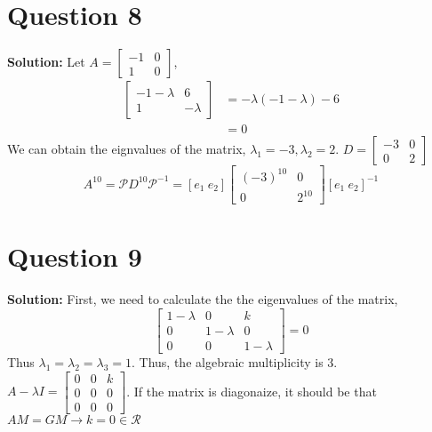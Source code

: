 \documentclass[11pt]{article} %
\begin{document}
\section{Question 8}
\textbf{Solution:}
Let $A=\begin{bmatrix}
	-1&0\\
	1&0
\end{bmatrix}$, 
\begin{align*}
	\begin{bmatrix}
		-1-\lambda&6\\
		1&-\lambda
	\end{bmatrix}&=-\lambda(-1-\lambda)-6\\
	&=0
\end{align*}
We can obtain the eignvalues of the matrix, $\lambda_1=-3, \lambda_2=2$. $D=\begin{bmatrix}
	-3&0\\
	0&2
\end{bmatrix}$
$$A^{10}=\mathcal{P}D^{10}\mathcal{P}^{-1}=[e_1\ e_2]\begin{bmatrix}
	(-3)^{10}&0\\
	0&2^{10}
\end{bmatrix}[e_1\ e_2]^{-1}$$

\section{Question 9}
\textbf{Solution:}
First, we need to calculate the the eigenvalues of the matrix,
$$\begin{bmatrix}
	1-\lambda&0&k\\
	0&1-\lambda&0\\
	0&0&1-\lambda
\end{bmatrix}=0$$
Thus $\lambda_1=\lambda_2=\lambda_3=1$.
Thus, the algebraic multiplicity is 3. 
$A-\lambda I= \begin{bmatrix}
	0&0&k\\
	0&0&0\\
	0&0&0
\end{bmatrix}$. If  the matrix is diagonaize, it should be that $AM=GM\longrightarrow k=0\in \mathcal{R}$

	
	
	
	
	
	
	
	
	
	
	
	
	
	
	
	
	
	
\end{document}
